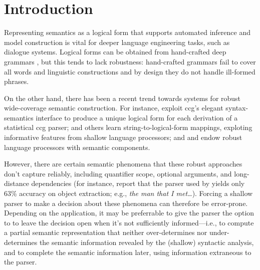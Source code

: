 \section{Introduction} \label{sec:intro}

Representing semantics as a logical form that supports automated
inference and model construction is vital for deeper language
engineering tasks, such as dialogue systems.  Logical forms
can be obtained from hand-crafted deep grammars
\cite{butt:etal:1999,copestake:flickinger:2000}, but this
tends to lack robustness: hand-crafted grammars fail to cover all
words and linguistic constructions and by design they do not handle
ill-formed phrases. 

On the other hand, there has been a recent trend towards systems for
robust wide-coverage semantic construction.  For instance,
 exploit {\sc ccg}'s elegant syntax-semantics
interface to produce a unique logical form for each derivation of a
statistical {\sc ccg} parser;  and
others learn string-to-logical-form mappings, exploting informative
features from shallow language processors; and
 and  endow robust
language processors with semantic components.

% 

However, there are certain semantic phenomena that these robust
approaches don't capture reliably, including quantifier scope,
optional arguments, and long-distance dependencies (for instance,
 report that the parser used by
 yields only 63\% accuracy on object
extraction; e.g., {\em the man that I met\dots}).  Forcing a shallow
parser to make a decision about these phenomena can therefore be
error-prone.  Depending on the application, it may be preferrable to
give the parser the option to to leave the decision open when it's not
sufficiently informed---i.e., to compute a partial semantic
representation that neither over-determines nor under-determines the
semantic information revealed by the (shallow) syntactic analysis, and
to complete the semantic information later, using information
extraneous to the parser.

